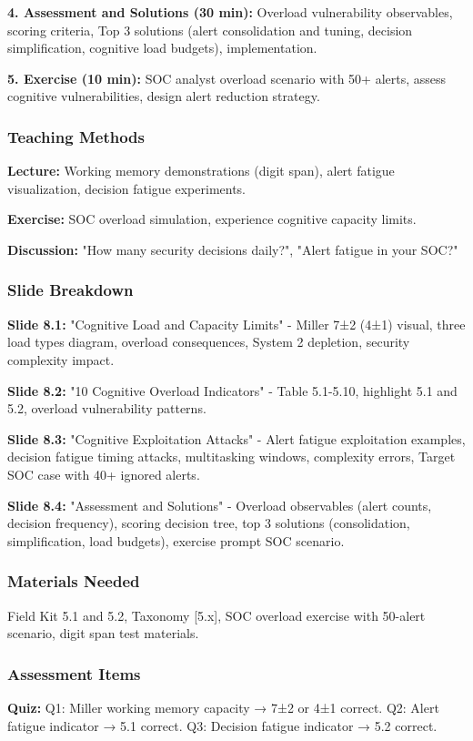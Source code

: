\documentclass[11pt,a4paper]{article}
\begin{document}
\textbf{4. Assessment and Solutions (30 min):} Overload vulnerability observables, scoring criteria, Top 3 solutions (alert consolidation and tuning, decision simplification, cognitive load budgets), implementation.

\textbf{5. Exercise (10 min):} SOC analyst overload scenario with 50+ alerts, assess cognitive vulnerabilities, design alert reduction strategy.

\subsubsection{Teaching Methods}
\textbf{Lecture:} Working memory demonstrations (digit span), alert fatigue visualization, decision fatigue experiments.

\textbf{Exercise:} SOC overload simulation, experience cognitive capacity limits.

\textbf{Discussion:} "How many security decisions daily?", "Alert fatigue in your SOC?"

\subsubsection{Slide Breakdown}
\textbf{Slide 8.1:} "Cognitive Load and Capacity Limits" - Miller 7±2 (4±1) visual, three load types diagram, overload consequences, System 2 depletion, security complexity impact.

\textbf{Slide 8.2:} "10 Cognitive Overload Indicators" - Table 5.1-5.10, highlight 5.1 and 5.2, overload vulnerability patterns.

\textbf{Slide 8.3:} "Cognitive Exploitation Attacks" - Alert fatigue exploitation examples, decision fatigue timing attacks, multitasking windows, complexity errors, Target SOC case with 40+ ignored alerts.

\textbf{Slide 8.4:} "Assessment and Solutions" - Overload observables (alert counts, decision frequency), scoring decision tree, top 3 solutions (consolidation, simplification, load budgets), exercise prompt SOC scenario.

\subsubsection{Materials Needed}
Field Kit 5.1 and 5.2, Taxonomy [5.x], SOC overload exercise with 50-alert scenario, digit span test materials.

\subsubsection{Assessment Items}
\textbf{Quiz:} Q1: Miller working memory capacity → 7±2 or 4±1 correct. Q2: Alert fatigue indicator → 5.1 correct. Q3: Decision fatigue indicator → 5.2 correct.
\end{document}
